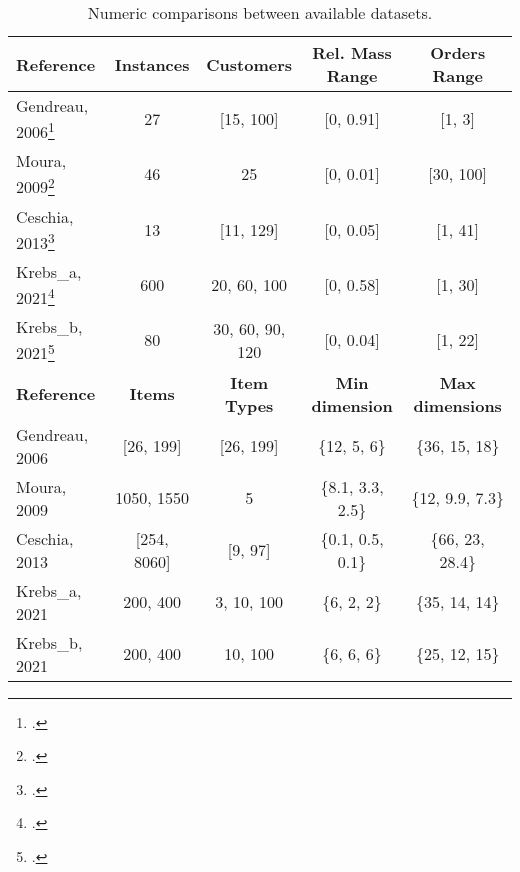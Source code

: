 \begin{table}[h]
    \centering
    \small
    \begin{tabular}{@{}lcccc@{}}
        \toprule
        \textbf{Reference}                                  & \textbf{Instances} & \textbf{Customers}  & \textbf{Rel. Mass Range} & \textbf{Orders Range}   \\
        \midrule
        Gendreau, 2006\footcite[cf.][]{gendreau_tabu_2006}  & 27                 & [15, 100]           & [0, 0.91]                & [1, 3]                  \\
        Moura, 2009\footcite[cf.][]{moura_integrated_2009}  & 46                 & 25                  & [0, 0.01]                & [30, 100]               \\
        Ceschia, 2013\footcite[cf.][]{ceschia_local_2013}   & 13                 & [11, 129]           & [0, 0.05]                & [1, 41]                 \\
        Krebs\_a, 2021\footcite[cf.][]{krebs_advanced_2021} & 600                & 20, 60, 100         & [0, 0.58]                & [1, 30]                 \\
        Krebs\_b, 2021\footcite[cf.][]{krebs_axle_2021}     & 80                 & 30, 60, 90, 120     & [0, 0.04]                & [1, 22]                 \\
        \toprule
        \textbf{Reference}                                  & \textbf{Items}     & \textbf{Item Types} & \textbf{Min dimension}   & \textbf{Max dimensions} \\
        \midrule
        Gendreau, 2006                                      & [26, 199]          & [26, 199]           & \{12, 5, 6\}             & \{36, 15, 18\}          \\
        Moura, 2009                                         & 1050, 1550         & 5                   & \{8.1, 3.3, 2.5\}        & \{12, 9.9, 7.3\}        \\
        Ceschia, 2013                                       & [254, 8060]        & [9, 97]             & \{0.1, 0.5, 0.1\}        & \{66, 23, 28.4\}        \\
        Krebs\_a, 2021                                      & 200, 400           & 3, 10, 100          & \{6, 2, 2\}              & \{35, 14, 14\}          \\
        Krebs\_b, 2021                                      & 200, 400           & 10, 100             & \{6, 6, 6\}              & \{25, 12, 15\}          \\
        \bottomrule
    \end{tabular}
    \caption{Numeric comparisons between available datasets.}
    \label{tab:dataset_comparison}
\end{table}

